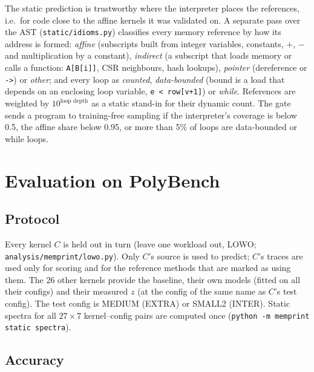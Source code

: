 \documentclass[11pt]{article}
\newcommand{\fittable}[1]{\sbox{\fitbox}{}%
  \ifdim\wd\fitbox>\linewidth\resizebox{\linewidth}{!}{\usebox{\fitbox}}\else\usebox{\fitbox}\fi}
\newcommand{\term}[1]{\emph{#1}}
\newcommand{\code}[1]{\texttt{#1}}
\begin{document}
The static prediction is trustworthy where the interpreter places the references, i.e.\ for code close to the affine
kernels it was validated on. A separate pass over the AST (\code{static/idioms.py}) classifies every memory
reference by how its address is formed: \term{affine} (subscripts built from integer variables, constants, $+$, $-$
and multiplication by a constant), \term{indirect} (a subscript that loads memory or calls a function:
\code{A[B[i]]}, CSR neighbours, hash lookups), \term{pointer} (dereference or \code{->}) or \term{other}; and every
loop as \term{counted}, \term{data-bounded} (bound is a load that depends on an enclosing loop variable,
\code{e < row[v+1]}) or \term{while}. References are weighted by $10^{\text{loop depth}}$ as a static stand-in for
their dynamic count. The gate sends a program to training-free sampling if the interpreter's coverage is below 0.5,
the affine share below 0.95, or more than 5\% of loops are data-bounded or while loops.

\clearpage
\section{Evaluation on PolyBench}
\label{sec:pb}

\subsection{Protocol}

Every kernel $C$ is held out in turn (leave one workload out, LOWO; \code{analysis/memprint/lowo.py}). Only $C$'s
source is used to predict; $C$'s traces are used only for scoring and for the reference methods that are marked as
using them. The 26 other kernels provide the baseline, their own models (fitted on all their configs) and their
measured $z$ (at the config of the same name as $C$'s test config). The test config is MEDIUM (EXTRA) or SMALL2
(INTER). Static spectra for all $27\times7$ kernel--config pairs are computed once
(\code{python -m memprint static spectra}).

\subsection{Accuracy}

\begin{table}[!htbp]
\centering\small
\caption[Leave-one-out accuracy on PolyBench]{Leave-one-workload-out MAPE (\%) of $\alpha$ on the held-out kernel,
27 kernels. The first row is the footprint error. ``Uses'' says what each method needs beyond the known programs.}
\label{tab:lowo}
\fittable{tables/lowo.tex}
\end{table}
\end{document}
